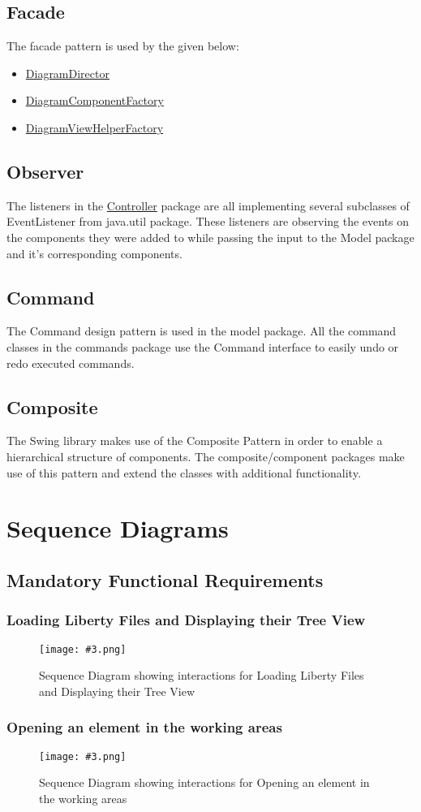 \documentclass[10pt,a4paper]{report}
\newcommand{\refer}[2]{\hyperref[#1]{\textcolor{col:reference}{#2}}}
\newcommand{\includeimage}[5]{
    \begin{figure}[H]
        #1
        \texttt{[image: \#3.png]}
        \caption{#4}
        \label{fig:#5}
    \end{figure}
}
\newcommand{\type}[1]{\textcolor{col:class}{#1}}
\newcommand{\packagebeginning}{edu.kit.informatik.pse.gelf} %
\newcommand{\lblroot}{lbl} %
\newcommand{\lblpackage}{} %
\newcommand{\lblpackageelement}{} %
\newcommand{\lblpackageelementmember}{} %
\newcommand{\lblpackageelementmemberparameter}{} %
\newcommand{\casclabelname}{\lblroot\lblpackage\lblpackageelement\lblpackageelementmember\lblpackageelementmemberparameter}
\newcommand{\casclabel}{\label{\casclabelname}}
\newcommand{\patternentry}[2]{
    #1{#2}
}
\newcommand{\pattern}[2]{
    \patternentry{\section}{#1}
    {#2}
}
\begin{document}
\pattern{Facade}{
    The facade pattern is used by the given below:
    \leavevmode \\
    \begin{itemize}
        \item \refer{\lblroot:view.diagrams:DiagramDirector}{DiagramDirector}
        \item \refer{\lblroot:view.diagrams.components:DiagramComponentFactory}{DiagramComponentFactory}
        \item \refer{\lblroot:view.diagrams.indicator:DiagramViewHelperFactory}{DiagramViewHelperFactory}
    \end{itemize}
}
\pattern{Observer}{The listeners in the \refer{\lblroot:controller.listeners}{Controller} package are all implementing several subclasses of \type{EventListener} from java.util package. These listeners are observing the events on the components they were added to while passing the input to the Model package and it's corresponding components.}
\pattern{Command}
{The Command design pattern is used in the model package.\newline
All the command classes in the commands package use the Command interface to easily undo or redo executed commands.}
\pattern{Composite}{
    The Swing library makes use of the Composite Pattern in order to enable a hierarchical structure of components. The composite/component packages make use of this pattern and extend the classes with additional functionality.
}

\chapter{Sequence Diagrams}
\section{Mandatory Functional Requirements}
\subsection{Loading Liberty Files and Displaying their Tree View}
\includeimage{}{0.23}{FR1-2}{Sequence Diagram showing interactions for Loading Liberty Files and Displaying their Tree View}{FR-1 and FR-2}
\subsection{Opening an element in the working areas}
\includeimage{}{0.24}{FR-4}{Sequence Diagram showing interactions for Opening an element in the working areas}{FR-4}
\end{document}
